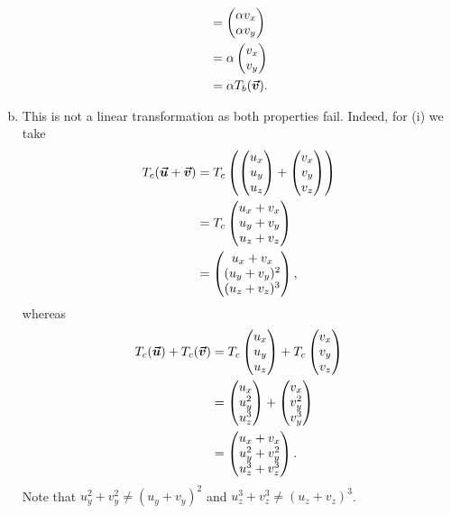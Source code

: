 \documentclass[12pt]{article} %
\begin{document}
\begin{solution}
\begin{enumerate}[(a)]
\begin{align*}
        &= \begin{pmatrix} \alpha v_x \\ \alpha v_y \end{pmatrix}\\
        &= \alpha \begin{pmatrix} v_x \\ v_y \end{pmatrix}\\
        &= \alpha T_b(\boldsymbol{\vec{v}}).
    \end{align*}
    \item This is not a linear transformation as both properties fail. Indeed, for (i) we take
    \begin{align*}
        T_c(\boldsymbol{\vec{u}} +\boldsymbol{\vec{v}}) &= T_c \left( \begin{pmatrix} u_x \\ u_y \\ u_z \end{pmatrix} + \begin{pmatrix} v_x \\ v_y \\ v_z \end{pmatrix} \right)\\
        &= T_c \begin{pmatrix} u_x + v_x \\ u_y + v_y \\ u_z + v_z \end{pmatrix}\\
        &= \begin{pmatrix} u_x + v_x \\ (u_y + v_y)^2 \\ (u_z + v_z)^3 \end{pmatrix},
    \end{align*}
    whereas
    \begin{align*}
    T_c (\boldsymbol{\vec{u}})+T_c(\boldsymbol{\vec{v}}) &= T_c \begin{pmatrix} u_x \\ u_y \\ u_z \end{pmatrix} +T_c\begin{pmatrix} v_x \\ v_y \\ v_z \end{pmatrix}\\
    &= \begin{pmatrix} u_x \\ u_y^2 \\ u_z^3 \end{pmatrix} + \begin{pmatrix} v_x \\ v_y^2 \\ v_y^3 \end{pmatrix}\\
    &= \begin{pmatrix} u_x + v_x \\ u_y^2 + v_y^2 \\ u_z^3 + v_z^3 \end{pmatrix}.
    \end{align*}
    Note that $u_y^2+v_y^2\neq (u_y+v_y)^2$ and $u_z^3+v_z^3\neq (u_z+v_z)^3$.


\end{enumerate}
\end{solution}
\end{document}
